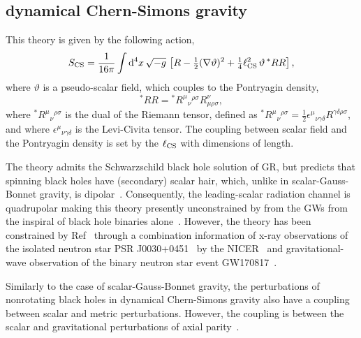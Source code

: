 \documentclass[twocolumn,prd,aps,superscriptaddress,preprintnumbers,tightenlines,showpacs,nofootinbib,eqsecnum,amsfonts,amsmath,longbibliography]{revtex4-1}
\newcommand{\dV}{{\rm d}^{4}x \, \sqrt{-g} \,}
\begin{document}
\subsection{dynamical Chern-Simons gravity}

This theory is given by the following action,
%
\begin{equation} \label{eq:action_dcs}
    S_{\rm CS} = \frac{1}{16 \pi}
    \int \dV
    \left[
    R - \tfrac{1}{2}(\nabla \vartheta)^2
    + \tfrac{1}{4} \ell^{2}_{\rm CS} \, \vartheta \, {}^{*}RR
    \right],
\end{equation}
%
where $\vartheta$ is a pseudo-scalar field, which couples
to the Pontryagin density,
%
\begin{equation}
    {}^{*}RR = {}^{*}R^{\mu}{}_{\nu}{}^{\rho\sigma} R^{\nu}_{\mu\rho\sigma},
\end{equation}
%
where ${}^{*}R^{\mu}{}_{\nu}{}^{\rho\sigma}$ is the dual of the Riemann tensor,
defined as
%
${}^{*}R^{\mu}{}_{\nu}{}^{\rho\sigma} =
\tfrac{1}{2} \epsilon^{\mu}{}_{\nu\gamma\delta}
R^{\gamma\delta\rho\sigma}$,
%
and where $\epsilon^{\mu}{}_{\nu\gamma\delta}$ is the Levi-Civita tensor.
%
The coupling between scalar field and the Pontryagin density is set by the
$\ell_{\rm CS}$ with dimensions of length.

The theory admits the Schwarzschild black hole solution of GR, but predicts
that spinning black holes have (secondary) scalar hair, which, unlike in
scalar-Gauss-Bonnet gravity, is dipolar~\cite{Yunes:2009hc,Konno:2009kg}.
%
Consequently, the leading-scalar radiation channel is quadrupolar making this
theory presently unconstrained by from the GWs from the inspiral of black hole
binaries alone~\cite{Nair:2019iur,Perkins:2021mhb}.
%
However, the theory has been constrained by Ref~\cite{Silva:2020acr} through a
combination information of x-ray observations of the isolated neutron star PSR
J0030+0451~\cite{Lommen:2000yt,NANOGrav:2017wvv} by the
NICER~\cite{Riley:2019yda,Miller:2019cac} and gravitational-wave observation of
the binary neutron star event GW170817~\cite{TheLIGOScientific:2017qsa}.

Similarly to the case of scalar-Gauss-Bonnet gravity, the perturbations of nonrotating
black holes in dynamical Chern-Simons gravity also have a coupling between scalar and
metric perturbations. However, the coupling is between the scalar and gravitational perturbations
of axial parity~\cite{Yunes:2007ss,Cardoso:2009pk,Molina:2010fb,Wagle:2021tam}.
\end{document}
